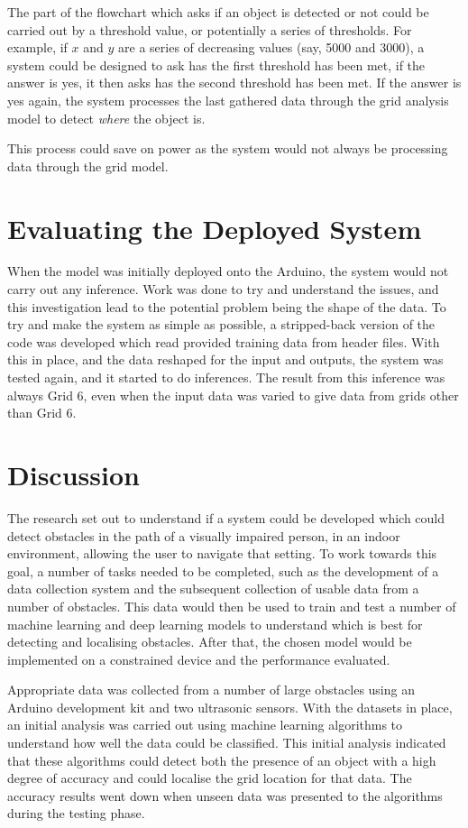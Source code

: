 \documentclass{svproc}
\begin{document}
The part of the flowchart which asks if an object is detected or not could be carried out by a threshold value, or potentially a series of thresholds. 
For example, if $x$ and $y$ are a series of decreasing values (say, 5000 and 3000), a system could be designed to ask has the first threshold has 
been met, if the answer is yes, it then asks has the second threshold has been met. If the answer is yes again, the system processes the last gathered 
data through the grid analysis model to detect \textit{where} the object is. 

This process could save on power as the system would not always be processing data through the grid model.

\section{Evaluating the Deployed System}
When the model was initially deployed onto the Arduino, the system would not carry out any inference. Work was done to try and understand the issues, 
and this investigation lead to the potential problem being the shape of the data. To try and make the system as simple as possible, a stripped-back 
version of the code was developed which read provided training data from header files. With this in place, and the data reshaped for the input 
and outputs, the system was tested again, and it started to do inferences. The result from this inference was always Grid 6, even when the input data 
was varied to give data from grids other than Grid 6.

\section{Discussion}
The research set out to understand if a system could be developed which could detect obstacles in the path of a visually impaired person, 
in an indoor environment, allowing the user to navigate that setting. To work towards this goal, a number of tasks needed to be completed, 
such as the development of a data collection system and the subsequent collection of usable data from a number of obstacles. This data would 
then be used to train and test a number of machine learning and deep learning models to understand which is best for detecting and localising 
obstacles. After that, the chosen model would be implemented on a constrained device and the performance evaluated. 

Appropriate data was collected from a number of large obstacles using an Arduino development kit and two ultrasonic sensors. With the datasets 
in place, an initial analysis was carried out using machine learning algorithms to understand how well the data could be classified. This initial 
analysis indicated that these algorithms could detect both the presence of an object with a high degree of accuracy and could localise the grid 
location for that data. The accuracy results went down when unseen data was presented to the algorithms during the testing phase. 
\end{document}
